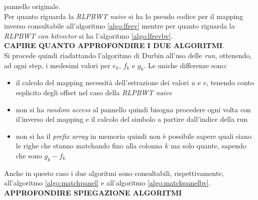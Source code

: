 pannello originale.\\
Per quanto riguarda la \textit{RLPBWT naive} si ha lo pseudo codice per il
mapping inverso consultabile all'algoritmo \ref{algo:lfrev} mentre per quanto
riguarda la \textit{RLPBWT con bitvector} si ha l'algoritmo
\ref{algo:lfrevbv}.\\
\textbf{CAPIRE QUANTO APPROFONDIRE I DUE ALGORITMI}.\\
Si procede quindi riadattando l'algoritmo di Durbin all'uso delle \textit{run},
ottenendo, ad ogni step, i medesimi valori per $e_k$, $f_k$ e $g_k$. Le uniche
differenze sono:
\begin{itemize}
  \item il calcolo del mapping necessità dell'estrazione dei valori $u$ e $v$,
  tenendo conto esplicito degli offset nel caso della \textit{RLPBWT naive}
  \item non si ha \textit{random access} al pannello quindi bisogna procedere
  ogni volta con il'inverso del mapping e il calcolo del simbolo a partire
  dall'indice della run
  \item non si ha il \textit{prefix array} in memoria quindi non è possibile
  sapere quali siano le righe che stanno matchando fino alla colonna $k$ ma solo
  quante, sapendo che sono $g_k-f_k$
\end{itemize}
Anche in questo caso i due algoritmi sono consultabili, rispettivamente,
all'algoritmo \ref{algo:matchpanel} e all'algoritmo \ref{algo:matchpanelbv}.\\
\textbf{APPROFONDIRE SPIEGAZIONE ALGORITMI}